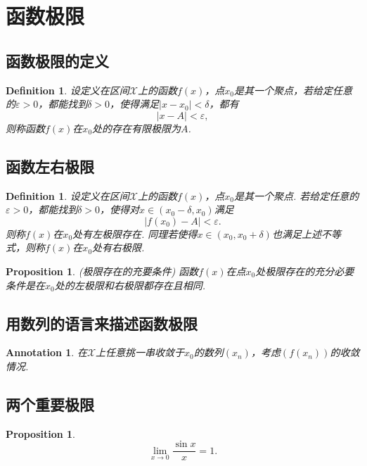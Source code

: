 \documentclass{article}
\newtheorem{proposition}[theorem]{Proposition}
\newtheorem{definition}[theorem]{Definition}
\newtheorem{annotation}[theorem]{Annotation}
\begin{document}
\newpage
\section{函数极限}

\subsection{函数极限的定义}

\begin{definition}
\rm 设定义在区间$\mathcal{X}$上的函数$f(x)$，点$x_0$是其一个聚点，若给定任意的$\varepsilon  > 0$，都能找到$\delta > 0$，使得满足$|x-x_0| < \delta$，都有
$$
|x-A| < \varepsilon,
$$
则称函数$f(x)$在$x_0$处的存在有限极限为$A$.
\end{definition}

\subsection{函数左右极限}
\begin{definition}
\rm 设定义在区间$\mathcal{X}$上的函数$f(x)$，点$x_0$是其一个聚点. 若给定任意的$\varepsilon > 0$，都能找到$\delta > 0$，使得对$x \in (x_0-\delta,x_0)$满足
$$
|f(x_0)-A| < \varepsilon.
$$
则称$f(x)$在$x_0$处有{\color{red}左极限}存在. 同理若使得$x \in (x_0,x_0 +\delta)$也满足上述不等式，则称$f(x)$在$x_0$处有{\color{red}右极限}.
\end{definition}

\begin{proposition}
\rm {\color{red} (极限存在的充要条件) }函数$f(x)$在点$x_0$处极限存在的充分必要条件是在$x_0$处的左极限和右极限都存在且相同.
\end{proposition}

\subsection{用数列的语言来描述函数极限}

\begin{annotation}
\rm 在$\mathcal{X}$上任意挑一串收敛于$x_0$的数列$(x_n)$，考虑$(f(x_n))$的收敛情况.
\end{annotation}

\subsection{两个重要极限}

\begin{proposition}
$$
\lim\limits_{x \rightarrow 0} \frac{\sin x}{x} = 1.
$$
\end{proposition}
\end{document}
